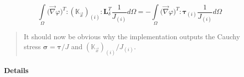 \documentclass[garamond]{goose-article}
\newcommand\T[1]{\bm{{#1}}}
\newcommand\TT[1]{\mathbb{{#1}}}
\begin{document}
\begin{equation}
  \int\limits_{\Omega} \big( \vec{\nabla} \varphi )^T : (\TT{K}_{\vec{x}})_{(i)} : \T{L}_\delta^T \frac{1}{J_{(i)}} d\Omega
  =
  - \int\limits_{\Omega} \big( \vec{\nabla} \varphi )^T : \T{\tau}_{(i)} \frac{1}{J_{(i)}} d\Omega
\end{equation}

\begin{framed}
\begin{quote}
  It should now be obvious why the implementation outputs the Cauchy stress $\T{\sigma} = \T{\tau} / J$ and $(\TT{K}_{\vec{x}})_{(i)} / J_{(i)}$.
\end{quote}
\end{framed}

\paragraph{Details}
\end{document}
